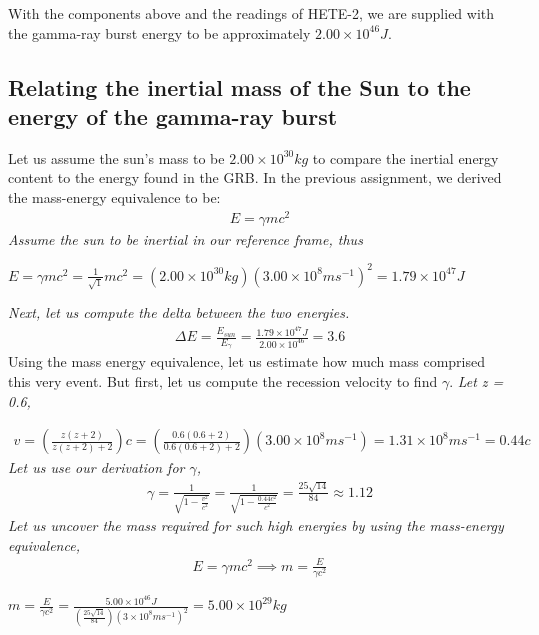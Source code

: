 \documentclass{article}
\begin{document}
With the components above and the readings of HETE-2, we are supplied with the gamma-ray burst energy to be approximately $2.00\times10^{46}J$. 

\subsection{Relating the inertial mass of the Sun to the energy of the gamma-ray burst}
Let us assume the sun's mass to be $2.00\times10^{30}kg$ to compare the inertial energy content to the energy found in the GRB. In the previous assignment, we derived the mass-energy equivalence to be:
\begin{gather*}
	E = \gamma mc^2
\end{gather*}
\textit{Assume the sun to be inertial in our reference frame, thus}
\begin{center}
	$\boxed{
	E = \gamma mc^2 = \frac{1}{\sqrt{1}} mc^2 = (2.00\times10^{30}kg)(3.00\times10^8ms^{-1})^2 = 1.79\times10^{47}J}
	$
	
\end{center}

\textit{Next, let us compute the delta between the two energies.}
\begin{gather*}
\Delta E = \frac{E_{sun}}{E_\gamma} = \frac{1.79\times10^{47}J}{2.00\times10^{46}} = 3.6
\end{gather*}
Using the mass energy equivalence, let us estimate how much mass comprised this very event. But first, let us compute the recession velocity to find $\gamma$. \textit{Let z = 0.6,}

\begin{gather*}
	v = \left(\frac{z(z+2)}{z(z+2)+2}\right)c = \left(\frac{0.6(0.6+2)}{0.6(0.6+2)+2}\right)(3.00\times10^8ms^{-1}) = 1.31\times10^8 ms^{-1} = 0.44c
\end{gather*}
\textit{Let us use our derivation for $\gamma$,}
\begin{gather*}
	\gamma = \frac{1}{\sqrt{1-\frac{v^2}{c^2}}} = \frac{1}{\sqrt{1-\frac{0.44c^2}{c^2}}}=\frac{25\sqrt{14}}{84}\approx1.12
\end{gather*}
\textit{Let us uncover the mass required for such high energies by using the mass-energy equivalence,}
\begin{gather*}
	E = \gamma mc^2 \implies m = \frac{E}{\gamma c^2} 
\end{gather*}

\begin{center}
	$\boxed{
	m = \frac{E}{\gamma c^2} =\frac{5.00\times10^{46}J}{\left(\frac{25\sqrt{14}}{84}\right) (3\times10^8ms^{-1})^2} = 5.00\times10^{29}kg}$

\end{center}
\end{document}
